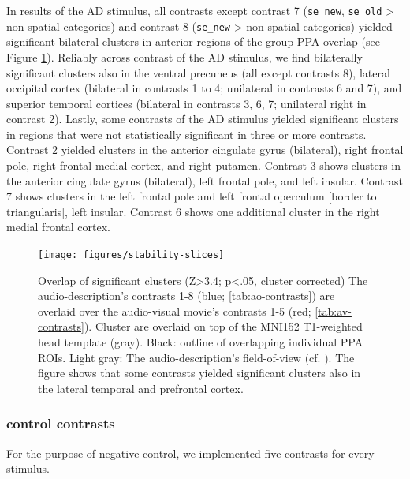 \documentclass[english]{article}
\begin{document}
In results of the AD stimulus, all contrasts except contrast 7
(\texttt{se\_new}, \texttt{se\_old} > non-spatial categories) and contrast 8
(\texttt{se\_new} > non-spatial categories) yielded significant bilateral
clusters in anterior regions of the group PPA overlap (see Figure
\ref{fig:stability-slices}).
Reliably across contrast of the AD stimulus, we find bilaterally significant
clusters also in the ventral precuneus (all except contrasts 8), lateral
occipital cortex (bilateral in contrasts 1 to 4; unilateral in contrasts 6 and
7), and superior temporal cortices (bilateral in contrasts 3, 6, 7; unilateral
right in contrast 2).
Lastly, some contrasts of the AD stimulus yielded significant clusters in
regions that were not statistically significant in three or more contrasts.
%
Contrast 2 yielded clusters in the anterior cingulate gyrus (bilateral), right
frontal pole, right frontal medial cortex, and right putamen.
%
Contrast 3 shows clusters in the anterior cingulate gyrus (bilateral), left
frontal pole, and left insular.
%
Contrast 7 shows clusters in the left frontal pole and left frontal operculum
[border to triangularis], left insular.
%
Contrast 6 shows one additional cluster in the right medial frontal cortex.


\begin{figure}[h!]
\centering
    \texttt{[image: figures/stability-slices]}
    \caption{Overlap of significant clusters (Z>3.4; p<.05, cluster corrected)
        The audio-description's contrasts 1-8 (blue; \ref{tab:ao-contrasts})
        are overlaid over the audio-visual movie's contrasts 1-5 (red;
        \ref{tab:av-contrasts}).
        Cluster are overlaid on top of the MNI152 T1-weighted head template
        (gray).
        Black: outline of overlapping individual PPA ROIs.
        Light gray: The audio-description's field-of-view (cf.
        \citep{hanke2014audiomovie}).
        The figure shows that some contrasts yielded significant clusters
        also in the lateral temporal and prefrontal cortex.
        }
    \label{fig:stability-slices}
\end{figure}


\subsubsection{control contrasts}

For the purpose of negative control, we implemented five contrasts for every
stimulus.
\end{document}
